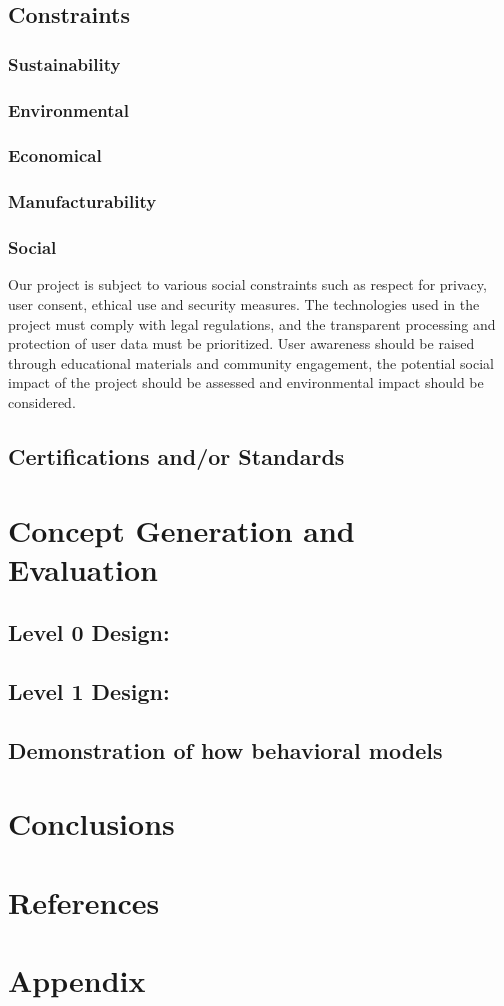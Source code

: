 \documentclass[12pt]{article}
\begin{document}
	\subsection{Constraints}
		\subsubsection{Sustainability}
		\subsubsection{Environmental}
		\subsubsection{Economical}
		\subsubsection{Manufacturability}
		\subsubsection{Social}
  		Our project is subject to various social constraints such as respect for privacy, user consent, ethical use and security measures. The technologies used in the project must comply with legal regulations, and the transparent processing and protection of user data must be prioritized. User awareness should be raised through educational materials and community engagement, the potential social impact of the project should be assessed and environmental impact should be considered.
	\subsection{Certifications and/or Standards}
	
	\section{Concept Generation and Evaluation}
	
	\subsection{Level 0 Design:}
	
	\subsection{Level 1 Design:}
	
	\subsection{Demonstration of how behavioral models}
	
	\section{Conclusions}
	
	\section{References}
	
	\section{Appendix}


	
	
\end{document}
